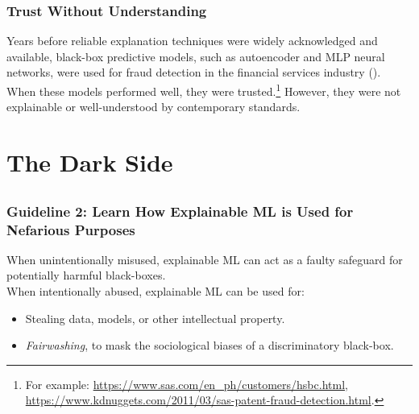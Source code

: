 \documentclass[11pt,
               aspectratio=169,
               hyperref={colorlinks}
               ]{beamer}
\begin{document}
	\begin{frame}
	
		\frametitle{Trust Without Understanding}
		\Large
		Years before reliable explanation techniques were widely acknowledged and available, black-box predictive models, such as autoencoder and MLP neural networks, were used for fraud detection in the financial services industry (\citet{gopinathan1998fraud}). When these models performed well, they were trusted.\footnote{\tiny{For example: \url{https://www.sas.com/en_ph/customers/hsbc.html}, \url{https://www.kdnuggets.com/2011/03/sas-patent-fraud-detection.html}}.} However, they were not explainable or well-understood by contemporary standards.  

	\end{frame}


	\section{The Dark Side}

	\subsection*{} %

	\begin{frame}
	
		\frametitle{\textbf{Guideline 2}: Learn How Explainable ML is Used for Nefarious Purposes}	
		\Large
		When unintentionally misused, explainable ML can act as a faulty safeguard for potentially harmful black-boxes.\\
		\vspace{10pt}
		When intentionally abused, explainable ML can be used for: 
		\begin{itemize}
			\item Stealing data, models, or other intellectual property.
			\item \textit{Fairwashing}, to mask the sociological biases of a discriminatory black-box.
		\end{itemize}
	
	\end{frame}
\end{document}
